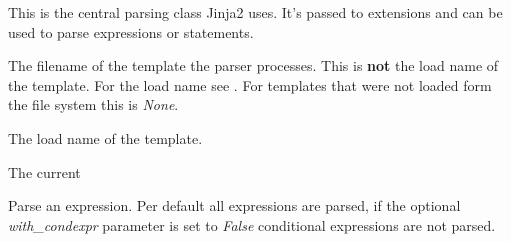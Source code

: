 \documentclass[a4paper,10pt,english]{sphinxmanual}
\begin{document}
\begin{fulllineitems}
\label{extensions:jinja2.parser.Parser}
This is the central parsing class Jinja2 uses.  It's passed to
extensions and can be used to parse expressions or statements.

\begin{fulllineitems}
\label{extensions:jinja2.ext.Parser.filename}
The filename of the template the parser processes.  This is \textbf{not}
the load name of the template.  For the load name see {\hyperref[extensions:jinja2.ext.Parser.name]{}}.
For templates that were not loaded form the file system this is
\emph{None}.

\end{fulllineitems}


\begin{fulllineitems}
\label{extensions:jinja2.ext.Parser.name}
The load name of the template.

\end{fulllineitems}


\begin{fulllineitems}
\label{extensions:jinja2.ext.Parser.stream}
The current {\hyperref[extensions:jinja2.lexer.TokenStream]{}}

\end{fulllineitems}


\begin{fulllineitems}
\label{extensions:jinja2.parser.Parser.parse_expression}
Parse an expression.  Per default all expressions are parsed, if
the optional \emph{with\_condexpr} parameter is set to \emph{False} conditional
expressions are not parsed.

\end{fulllineitems}



\end{fulllineitems}
\end{document}
